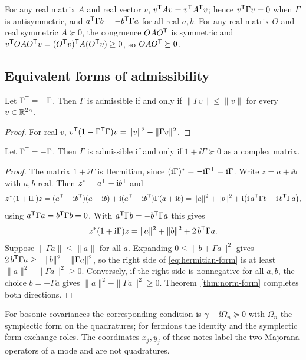 For any real matrix $A$ and real vector $v$, $v^{\mathsf T}Av=v^{\mathsf T}A^{\mathsf T}v$; hence
$v^{\mathsf T}\Gamma v=0$ when $\Gamma$ is antisymmetric, and $a^{\mathsf T}\Gamma b=-b^{\mathsf T}\Gamma a$
for all real $a,b$. For any real matrix $O$ and real symmetric $A\succeq0$, the
congruence $OAO^{\mathsf T}$ is symmetric and
$v^{\mathsf T}OAO^{\mathsf T}v=(O^{\mathsf T}v)^{\mathsf T}A(O^{\mathsf T}v)\geq0$, so $OAO^{\mathsf T}\succeq0$.

\subsection{Equivalent forms of admissibility}

\begin{theorem}\label{thm:norm-form}
Let $\Gamma^{\mathsf T}=-\Gamma$. Then $\Gamma$ is admissible if and only if
$\|\Gamma v\|\leq\|v\|$ for every $v\in\mathbb R^{2n}$.
\end{theorem}
\begin{proof}
For real $v$, $v^{\mathsf T}(1-\Gamma^{\mathsf T}\Gamma)v=\|v\|^2-\|\Gamma v\|^2$.
\end{proof}


\begin{theorem}\label{thm:hermitian-form}
Let $\Gamma^{\mathsf T}=-\Gamma$. Then $\Gamma$ is admissible if and only if
$1+\ii\Gamma\succeq0$ as a complex matrix.
\end{theorem}
\begin{proof}
The matrix $1+\ii\Gamma$ is Hermitian, since
$(\mathrm i\Gamma)^*=-\mathrm i\Gamma^{\mathsf T}=\mathrm i\Gamma$. Write $z=a+\ii b$ with $a,b$ real.
Then $z^*=a^{\mathsf T}-\mathrm i b^{\mathsf T}$ and
\[
 z^*(1+\mathrm i\Gamma)z
 =(a^{\mathsf T}-\mathrm i b^{\mathsf T})(a+\mathrm i b)+\mathrm i(a^{\mathsf T}-\mathrm i b^{\mathsf T})\Gamma(a+\mathrm i b)
 =\|a\|^2+\|b\|^2+\mathrm i\bigl(\mathrm i\,a^{\mathsf T}\Gamma b-\mathrm i\,b^{\mathsf T}\Gamma a\bigr),
\]
using $a^{\mathsf T}\Gamma a=b^{\mathsf T}\Gamma b=0$. With $a^{\mathsf T}\Gamma b=-b^{\mathsf T}\Gamma a$ this gives
\begin{equation}\label{eq:hermitian-form}
 z^*(1+\mathrm i\Gamma)z=\|a\|^2+\|b\|^2+2\,b^{\mathsf T}\Gamma a .
\end{equation}
Suppose $\|\Gamma a\|\leq\|a\|$ for all $a$. Expanding $0\leq\|b+\Gamma a\|^2$ gives
$2\,b^{\mathsf T}\Gamma a\geq-\|b\|^2-\|\Gamma a\|^2$, so the right side of
\eqref{eq:hermitian-form} is at least $\|a\|^2-\|\Gamma a\|^2\geq0$. Conversely, if
the right side is nonnegative for all $a,b$, the choice $b=-\Gamma a$ gives
$\|a\|^2-\|\Gamma a\|^2\geq0$. Theorem~\ref{thm:norm-form} completes both directions.
\end{proof}
\begin{remark}\label{rem:bosonic}
For bosonic covariances the corresponding condition is $\gamma-\ii\Omega_n\succeq0$
with $\Omega_n$ the symplectic form on the quadratures; for fermions the identity and
the symplectic form exchange roles. The coordinates $x_j,y_j$ of these notes label the
two Majorana operators of a mode and are not quadratures.
\end{remark}

